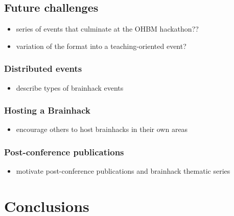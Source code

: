 \documentclass[11pt]{bmc_article_s50}
\providecommand{\tightlist}{%
  \setlength{\itemsep}{0pt}\setlength{\parskip}{0pt}}
\begin{document}
\subsection{Future challenges}\label{future-challenges}

\begin{itemize}
\tightlist
\item
  series of events that culminate at the OHBM hackathon??
  
\item
  variation of the format into a teaching-oriented event?
\end{itemize}

\subsubsection{Distributed events}\label{distributed-events}

\begin{itemize}
\tightlist
\item
  describe types of brainhack events
\end{itemize}

\subsubsection{Hosting a Brainhack}\label{hosting-a-brainhack}

\begin{itemize}
\tightlist
\item
  encourage others to host brainhacks in their own areas
\end{itemize}

\subsubsection{Post-conference
publications}\label{post-conference-publications}

\begin{itemize}
\tightlist
\item
  motivate post-conference publications and brainhack thematic series
\end{itemize}

\section{Conclusions}\label{conclusions}
\end{document}
